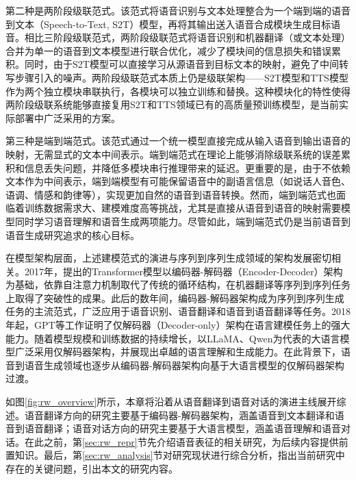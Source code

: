 第二种是两阶段级联范式。该范式将语音识别与文本处理整合为一个端到端的语音到文本（Speech-to-Text, S2T）模型，再将其输出送入语音合成模块生成目标语音。相比三阶段级联范式，两阶段级联范式将语音识别和机器翻译（或文本处理）合并为单一的语音到文本模型进行联合优化，减少了模块间的信息损失和错误累积。同时，由于S2T模型可以直接学习从源语音到目标文本的映射，避免了中间转写步骤引入的噪声。两阶段级联范式本质上仍是级联架构——S2T模型和TTS模型作为两个独立模块串联执行，各模块可以独立训练和替换。这种模块化的特性使得两阶段级联系统能够直接复用S2T和TTS领域已有的高质量预训练模型，是当前实际部署中广泛采用的方案。

第三种是端到端范式。该范式通过一个统一模型直接完成从输入语音到输出语音的映射，无需显式的文本中间表示。端到端范式在理论上能够消除级联系统的误差累积和信息丢失问题，并降低多模块串行推理带来的延迟。更重要的是，由于不依赖文本作为中间表示，端到端模型有可能保留语音中的副语言信息（如说话人音色、语调、情感和韵律等），实现更加自然的语音到语音转换。然而，端到端范式也面临着训练数据需求大、建模难度高等挑战，尤其是直接从语音到语音的映射需要模型同时学习语音理解和语音生成两项能力。尽管如此，端到端范式仍是当前语音到语音生成研究追求的核心目标。

在模型架构层面，上述建模范式的演进与序列到序列生成领域的架构发展密切相关。2017年，\citet{transformer}提出的Transformer模型以编码器-解码器（Encoder-Decoder）架构为基础，依靠自注意力机制取代了传统的循环结构，在机器翻译等序列到序列任务上取得了突破性的成果。此后的数年间，编码器-解码器架构成为序列到序列生成任务的主流范式，广泛应用于语音识别、语音翻译和语音到语音翻译等任务。2018年起，GPT\citep{gpt1}等工作证明了仅解码器（Decoder-only）架构在语言建模任务上的强大能力。随着模型规模和训练数据的持续增长，以LLaMA\citep{touvron2023llama}、Qwen\citep{yang2024qwen2}为代表的大语言模型广泛采用仅解码器架构，并展现出卓越的语言理解和生成能力。在此背景下，语音到语音生成领域也逐步从编码器-解码器架构向基于大语言模型的仅解码器架构过渡。

如图\ref{fig:rw_overview}所示，本章将沿着从语音翻译到语音对话的演进主线展开综述。语音翻译方向的研究主要基于编码器-解码器架构，涵盖语音到文本翻译和语音到语音翻译；语音对话方向的研究主要基于大语言模型，涵盖语音理解和语音对话。在此之前，第\ref{sec:rw_repr}节先介绍语音表征的相关研究，为后续内容提供前置知识。最后，第\ref{sec:rw_analysis}节对研究现状进行综合分析，指出当前研究中存在的关键问题，引出本文的研究内容。

